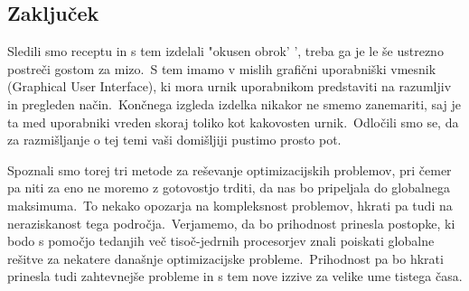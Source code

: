 \documentclass[a4paper,10pt]{article}
\begin{document}
\subsection{Zaključek} %

Sledili smo receptu in s tem izdelali "okusen obrok' ', treba ga je le še ustrezno postreči
gostom za mizo.\ S tem imamo v mislih grafični uporabniški vmesnik (Graphical
User Interface), ki mora urnik uporabnikom predstaviti na razumljiv in
pregleden način.\ Končnega izgleda izdelka nikakor ne smemo zanemariti, saj je ta med uporabniki
vreden skoraj toliko kot kakovosten urnik.\ Odločili smo se, da za razmišljanje o tej temi vaši
domišljiji pustimo prosto pot.

Spoznali smo torej tri metode za reševanje optimizacijskih problemov, pri čemer pa niti za eno
ne moremo z gotovostjo trditi, da nas bo pripeljala do globalnega maksimuma.\ To nekako opozarja
na kompleksnost problemov, hkrati pa tudi na neraziskanost tega področja.\ Verjamemo, da bo
prihodnost prinesla postopke, ki bodo s pomočjo tedanjih več tisoč-jedrnih procesorjev znali
poiskati globalne rešitve za nekatere današnje optimizacijske probleme.\ Prihodnost pa bo
hkrati prinesla tudi zahtevnejše probleme in s tem nove izzive za velike ume tistega časa.
\end{document}
